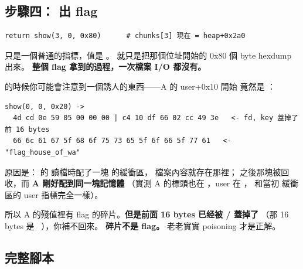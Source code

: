 \subsection{步驟四： 出 flag}

\begin{lstlisting}[style=py]
return show(3, 0, 0x80)      # chunks[3] 現在 = heap+0x2a0
\end{lstlisting}

\begin{keybox}
 只是一個普通的指標，值是 。
 就只是把那個位址開始的 0x80 個 byte hexdump 出來。
\textbf{整個 flag 拿到的過程，一次檔案 I/O 都沒有。}
\end{keybox}

\begin{warnbox}
 的時候你可能會注意到一個誘人的東西——A 的 user+0x10 開始
竟然是 ：

\begin{lstlisting}[style=raw]
show(0, 0, 0x20) ->
  4d cd 0e 59 05 00 00 00 | c4 10 df 66 02 cc 49 3e   <- fd, key 蓋掉了前 16 bytes
  66 6c 61 67 5f 68 6f 75 73 65 5f 6f 66 5f 77 61   <- "flag_house_of_wa"
\end{lstlisting}

原因是： 的  讀檔時配了一塊  的緩衝區，
檔案內容就存在那裡； 之後那塊被回收，而 \textbf{A 剛好配到同一塊記憶體}
（實測 A 的標頭也在 ，user 在 ，
和當初  緩衝區的 user 指標完全一樣）。

所以 A 的殘值裡有 flag 的碎片。\textbf{但是前面 16 bytes 已经被 / 蓋掉了}
（那 16 bytes 是 \ ），你補不回來。
\textbf{碎片不是 flag。} 老老實實 poisoning 才是正解。
\end{warnbox}

\subsection{完整腳本}

